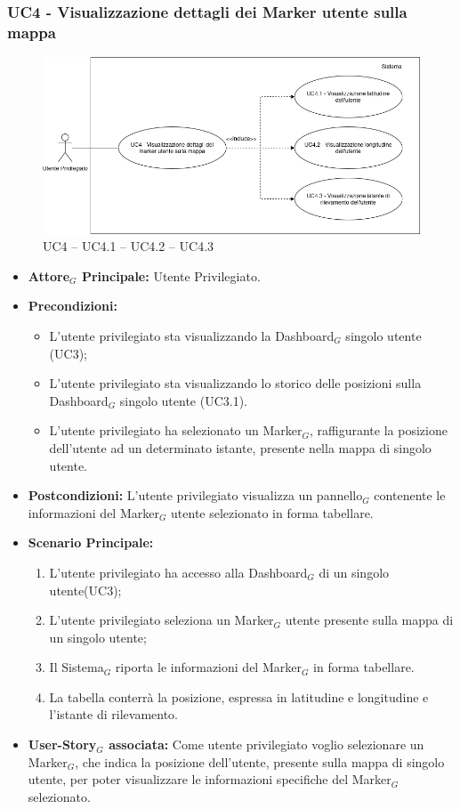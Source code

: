 \documentclass[10pt]{article}
\begin{document}
\begin{justify}
\subsubsection{\textbf{UC4 - Visualizzazione dettagli dei Marker utente sulla mappa}}
\begin{figure}[H]
    \centering
    \includegraphics[width=0.7\linewidth]{UC4image.png}
    \caption{UC4 -- UC4.1 -- UC4.2 -- UC4.3}
    \label{fig:UC4}
\end{figure}
\label{UC4}
\begin{itemize}
     \item \textbf{Attore$_G$ Principale:} Utente Privilegiato.
     \item \textbf{Precondizioni:}
        \begin{itemize}
    		\item L'utente privilegiato sta visualizzando la Dashboard$_G$ singolo utente (UC3);
    		\item L'utente privilegiato sta visualizzando lo storico delle posizioni sulla Dashboard$_G$ singolo utente (UC3.1).
          \item L'utente privilegiato ha selezionato un Marker$_G$, raffigurante la posizione dell'utente ad un determinato istante, presente nella mappa di singolo utente.
        \end{itemize}
      \item \textbf{Postcondizioni:} L'utente privilegiato visualizza un pannello$_G$ contenente le informazioni del Marker$_G$ utente selezionato in forma tabellare. 
      \item \textbf{Scenario Principale:}
        \begin{enumerate}
            \item L'utente privilegiato ha accesso alla Dashboard$_G$ di un singolo utente(UC3);
            \item L'utente privilegiato seleziona un Marker$_G$ utente presente sulla mappa di un singolo utente;
            \item Il Sistema$_G$ riporta le informazioni del Marker$_G$ in forma tabellare.
            \item La tabella conterrà la posizione, espressa in latitudine e longitudine e l'istante di rilevamento.
        \end{enumerate}
     \item \textbf{User-Story$_G$ associata:}
       Come utente privilegiato voglio selezionare un Marker$_G$, che indica la posizione dell'utente, presente sulla mappa di singolo utente, per poter visualizzare le informazioni specifiche del Marker$_G$ selezionato.
\end{itemize}


\end{justify}
\end{document}
